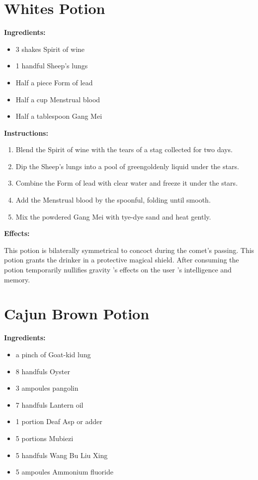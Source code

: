 \documentclass{article}
\begin{document}
\newpage
\section*{Whites Potion}

\textbf{Ingredients:}

\begin{itemize}
  \item 3 shakes Spirit of wine
  \item 1 handful Sheep's lungs
  \item Half a piece Form of lead
  \item Half a cup Menstrual blood
  \item Half a tablespoon Gang Mei
\end{itemize}

\textbf{Instructions:}

\begin{enumerate}
  \item Blend the Spirit of wine with the tears of a stag collected for two days.
  \item Dip the Sheep's lungs into a pool of greengoldenly liquid under the stars.
  \item Combine the Form of lead with clear water and freeze it under the stars.
  \item Add the Menstrual blood by the spoonful, folding until smooth.
  \item Mix the powdered Gang Mei with tye-dye sand and heat gently.
\end{enumerate}

\textbf{Effects:}

This potion is bilaterally symmetrical to concoct during the comet’s passing. This potion grants the drinker in a protective magical shield. After consuming the potion temporarily nullifies gravity 's effects on the user 's intelligence and memory.

\newpage
\section*{Cajun Brown Potion}

\textbf{Ingredients:}

\begin{itemize}
  \item a pinch of Goat-kid lung
  \item 8 handfuls Oyster
  \item 3 ampoules pangolin
  \item 7 handfuls Lantern oil
  \item 1 portion Deaf Asp or adder
  \item 5 portions Mubiezi
  \item 5 handfuls Wang Bu Liu Xing
  \item 5 ampoules Ammonium fluoride
\end{itemize}
\end{document}
